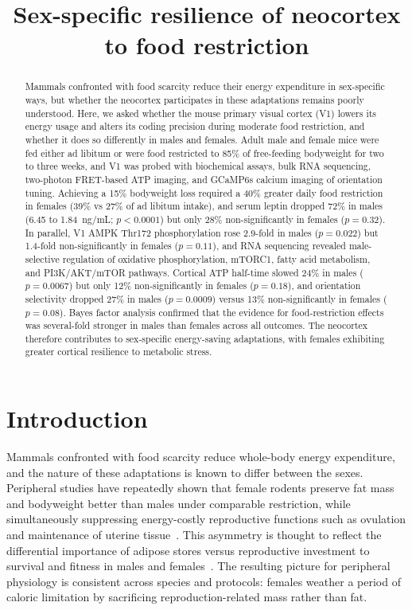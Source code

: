 \documentclass[11pt]{article}
\title{Sex-specific resilience of neocortex to food restriction}
\date{}
\author{}
\begin{document}
\maketitle

\begin{abstract}
Mammals confronted with food scarcity reduce their energy expenditure in sex-specific ways, but whether the neocortex participates in these adaptations remains poorly understood. Here, we asked whether the mouse primary visual cortex (V1) lowers its energy usage and alters its coding precision during moderate food restriction, and whether it does so differently in males and females. Adult male and female mice were fed either ad libitum or were food restricted to 85\% of free-feeding bodyweight for two to three weeks, and V1 was probed with biochemical assays, bulk RNA sequencing, two-photon FRET-based ATP imaging, and GCaMP6s calcium imaging of orientation tuning. Achieving a 15\% bodyweight loss required a 40\% greater daily food restriction in females (39\% vs 27\% of ad libitum intake), and serum leptin dropped 72\% in males (6.45 to 1.84~ng/mL; $p<0.0001$) but only 28\% non-significantly in females ($p=0.32$). In parallel, V1 AMPK Thr172 phosphorylation rose 2.9-fold in males ($p=0.022$) but 1.4-fold non-significantly in females ($p=0.11$), and RNA sequencing revealed male-selective regulation of oxidative phosphorylation, mTORC1, fatty acid metabolism, and PI3K/AKT/mTOR pathways. Cortical ATP half-time slowed 24\% in males ($p=0.0067$) but only 12\% non-significantly in females ($p=0.18$), and orientation selectivity dropped 27\% in males ($p=0.0009$) versus 13\% non-significantly in females ($p=0.08$). Bayes factor analysis confirmed that the evidence for food-restriction effects was several-fold stronger in males than females across all outcomes. The neocortex therefore contributes to sex-specific energy-saving adaptations, with females exhibiting greater cortical resilience to metabolic stress.
\end{abstract}

\section{Introduction}

Mammals confronted with food scarcity reduce whole-body energy expenditure, and the nature of these adaptations is known to differ between the sexes. Peripheral studies have repeatedly shown that female rodents preserve fat mass and bodyweight better than males under comparable restriction, while simultaneously suppressing energy-costly reproductive functions such as ovulation and maintenance of uterine tissue~\citep{lovdel2024hsd11b1, lopezdominguez2016omega3, greenfield2025lifespan, ryu2023timerestricted, jeromson2024gdf15}. This asymmetry is thought to reflect the differential importance of adipose stores versus reproductive investment to survival and fitness in males and females~\citep{nestor2014crosstalk}. The resulting picture for peripheral physiology is consistent across species and protocols: females weather a period of caloric limitation by sacrificing reproduction-related mass rather than fat.
\end{document}
